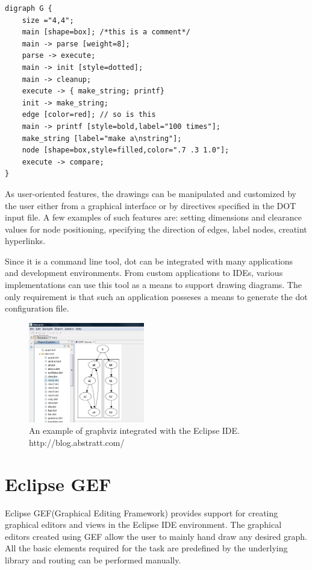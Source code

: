 \begin{lstlisting}[caption={Customized graph dot file representation}]
digraph G {
	size ="4,4";
	main [shape=box]; /*this is a comment*/
	main -> parse [weight=8];
	parse -> execute;
	main -> init [style=dotted];
	main -> cleanup;
	execute -> { make_string; printf}
	init -> make_string;
	edge [color=red]; // so is this
	main -> printf [style=bold,label="100 times"];
	make_string [label="make a\nstring"];
	node [shape=box,style=filled,color=".7 .3 1.0"];
	execute -> compare;
}
\end{lstlisting}

As user-oriented features, the drawings can be manipulated and customized by the user either from a graphical 
interface or by directives specified in the DOT input file. A few examples of such features are: setting dimensions 
and clearance values for node positioning, specifying the direction of edges, label nodes, creatint hyperlinks.

Since it is a command line tool, dot can be integrated with many applications and development environments. From 
custom applications to IDEs, various implementations can use this tool as a means to support drawing diagrams. The 
only requirement is that such an application posseses a means to generate the dot configuration file.

\begin{figure}[ht] \centering
\includegraphics[width=0.45\textwidth]{img/relatedwork/graphviz.png}
\caption{An example of graphviz integrated with the Eclipse IDE. http://blog.abstratt.com/} \end{figure}

\section{Eclipse GEF}

Eclipse GEF(Graphical Editing Framework) provides support for creating graphical editors and views in the Eclipse IDE environment. The graphical 
editors created using GEF allow the user to mainly hand draw any desired graph. All the basic elements required for the task are predefined 
by the underlying library and routing can be performed manually.

